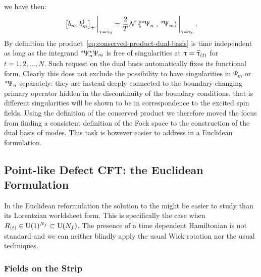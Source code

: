 we have then:
\begin{equation}
  \eval{\liebraket{b_n}{b_m^{\dagger}}_+}_{\tau = \tau_0}
  =
  \frac{2}{T} \cN \eval{\lconsprod{\dual{\Psi}_n}{\dual{\Psi}_m}}_{\tau = \tau_0}.
  \label{eq:Mink_can_anticomm_rel_ann_des}
\end{equation}
By definition the product~\eqref{eq:conserved-product-dual-basis} is time independent as long as the integrand $\dual{\Psi}_n^* \Psi_m$ is free of singularities at $\uptau = \widehat{\uptau}_{(t)}$ for $t = 1, 2, \dots, N$.
Such request on the dual basis automatically fixes its functional form.
Clearly this does not exclude the possibility to have singularities in $\Psi_m$ or $\dual{\Psi}_n$ separately: they are instead deeply connected to the boundary changing primary operator hidden in the discontinuity of the boundary conditions, that is different singularities will be shown to be in correspondence to the excited spin fields.
Using the definition of the conserved product we therefore moved the focus from finding a consistent definition of the Fock space to the construction of the dual basis of modes.
This task is however easier to address in a Euclidean formulation.


\subsection{Point-like Defect CFT: the Euclidean Formulation}
\label{sec:eucl_formulation}

In the Euclidean reformulation the solution to the \eom might be easier to study than its Lorentzian worldsheet form.
This is specifically the case when $R_{(t)} \in \mathrm{U}(1)^{N_f} \subset \mathrm{U}(N_f)$.
The presence of a time dependent Hamiltonian is not standard and we can neither blindly apply the usual Wick rotation nor the usual \cft techniques.


\subsubsection{Fields on the Strip}

